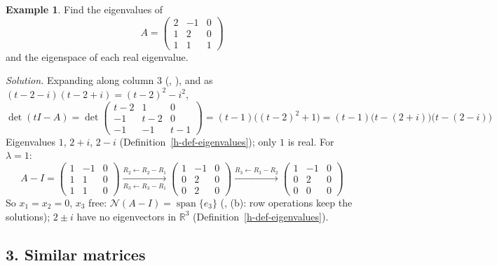 \documentclass[12pt]{article}
\newcommand{\R}{\mathbb R}
\DeclareMathOperator{\Span}{span}
\theoremstyle{definition}
\newtheorem{example}[theorem]{Example}
\begin{document}
\begin{example}\label{h-exm-complex}
Find the eigenvalues of
\[
A=\begin{pmatrix}2&-1&0\\1&2&0\\1&1&1\end{pmatrix}
\]
and the eigenspace of each real eigenvalue.
\end{example}
\textit{Solution.} Expanding along column \(3\) (, ), and as \((t-2-i)(t-2+i)=(t-2)^2-i^2\),
\[
\det(tI-A)=\det\begin{pmatrix}t-2&1&0\\-1&t-2&0\\-1&-1&t-1\end{pmatrix}=(t-1)\bigl((t-2)^2+1\bigr)
=(t-1)\bigl(t-(2+i)\bigr)\bigl(t-(2-i)\bigr)
\]
Eigenvalues \(1\), \(2+i\), \(2-i\) (Definition~\ref{h-def-eigenvalues}); only \(1\)
is real. For \(\lambda=1\):
\[
A-I=\begin{pmatrix}1&-1&0\\1&1&0\\1&1&0\end{pmatrix}
\xrightarrow[R_3\leftarrow R_3-R_1]{R_2\leftarrow R_2-R_1}
\begin{pmatrix}1&-1&0\\0&2&0\\0&2&0\end{pmatrix}
\xrightarrow{R_3\leftarrow R_3-R_2}
\begin{pmatrix}1&-1&0\\0&2&0\\0&0&0\end{pmatrix}
\]
So \(x_1=x_2=0\), \(x_3\) free: \(\mathcal N(A-I)=\Span\{e_3\}\) (, (b): row operations keep the
solutions); \(2\pm i\) have no eigenvectors in \(\R^3\) (Definition~\ref{h-def-eigenvalues}).

\subsection*{3. Similar matrices}
\end{document}
